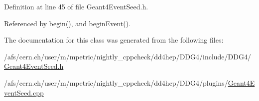 Definition at line 45 of file Geant4EventSeed.h.

Referenced by begin(), and beginEvent().

The documentation for this class was generated from the following files:\begin{DoxyCompactItemize}
\item 
/afs/cern.ch/user/m/mpetric/nightly\_\-cppcheck/dd4hep/DDG4/include/DDG4/\hyperlink{_geant4_event_seed_8h}{Geant4EventSeed.h}\item 
/afs/cern.ch/user/m/mpetric/nightly\_\-cppcheck/dd4hep/DDG4/plugins/\hyperlink{_geant4_event_seed_8cpp}{Geant4EventSeed.cpp}\end{DoxyCompactItemize}
